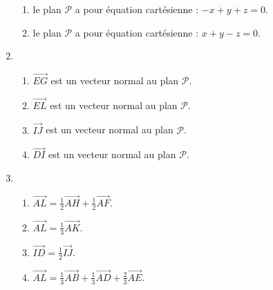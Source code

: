 \begin{enumerate}
\begin{enumerate}
          \item
          le plan $\mathscr P$ a pour équation cartésienne : $-x+y+z=0$.
          \item
     le plan $\mathscr P$ a pour équation cartésienne : $x+y-z=0$.\end{enumerate}
     \item
     \begin{enumerate}
          \item
          $\overrightarrow{EG}$ est un vecteur normal au plan $\mathscr P$.
          \item
          $\overrightarrow{EL}$ est un vecteur normal au plan $\mathscr P$.
          \item
          $\overrightarrow{IJ}$ est un vecteur normal au plan $\mathscr P$.
          \item
     $\overrightarrow{DI}$ est un vecteur normal au plan $\mathscr P$.\end{enumerate}
     \item
     \begin{enumerate}
          \item
          $\overrightarrow{AL}=\frac{1}{2}\overrightarrow{AH}+\frac{1}{2}\overrightarrow{AF}$.
          \item
          $\overrightarrow{AL}=\frac{1}{3}\overrightarrow{AK}$.
          \item
          $\overrightarrow{ID}=\frac{1}{2}\overrightarrow{IJ}$.
          \item
     $\overrightarrow{AL}=\frac{1}{3}\overrightarrow{AB}+\frac{1}{3}\overrightarrow{AD}+\frac{2}{3} \overrightarrow{AE}$.\end{enumerate}
\end{enumerate}
